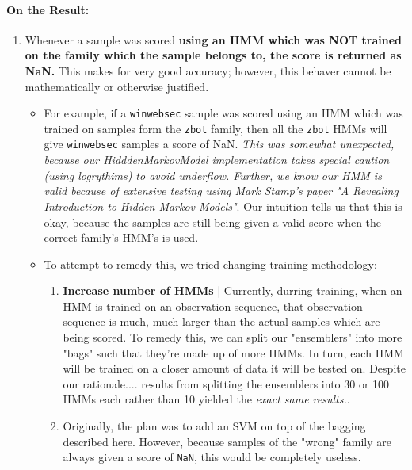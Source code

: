 \documentclass[12pt]{article}
\begin{document}
  \paragraph{On the Result:}
  \begin{enumerate}
    \item Whenever a sample was scored \textbf{using an HMM which was NOT trained on the family which the sample belongs to, the score is returned as NaN.} This makes for very good accuracy; however, this behaver cannot be mathematically or otherwise justified.
      \begin{itemize}
        \item For example, if a \texttt{winwebsec} sample was scored using an HMM which was trained on samples form the \texttt{zbot} family, then all the \texttt{zbot} HMMs will give \texttt{winwebsec} samples a score of NaN. \textit{This was somewhat unexpected, because our HidddenMarkovModel implementation takes special caution (using logrythims) to avoid underflow. Further, we know our HMM is valid because of extensive testing using Mark Stamp's paper "A Revealing Introduction to Hidden Markov Models"}. Our intuition tells us that this is okay, because the samples are still being given a valid score when the correct family's HMM's is used.
        \item To attempt to remedy this, we tried changing training methodology:
          \begin{enumerate}
            \item \textbf{Increase number of HMMs} | Currently, durring training, when an HMM is trained on an observation sequence, that observation sequence is much, much larger than the actual samples which are being scored. To remedy this, we can split our "ensemblers" into more "bags" such that they're made up of more HMMs. In turn, each HMM will be trained on a closer amount of data it will be tested on. Despite our rationale.... results from splitting the ensemblers into 30 or 100 HMMs each rather than 10 yielded the \textit{exact same results.}.
        \item Originally, the plan was to add an SVM on top of the bagging described here. However, because samples of the "wrong" family are always given a score of \texttt{NaN}, this would be completely useless.
          \end{enumerate}
     \end{itemize}
  \end{enumerate}

\appendix
\end{document}
